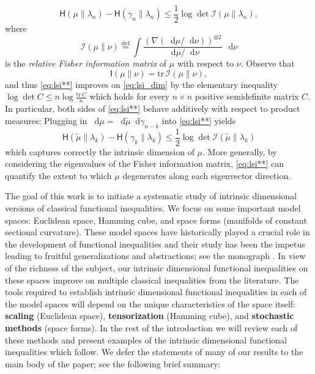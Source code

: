 \documentclass[a4paper,twoside,11pt,reqno]{amsart}
\newcommand{\eqdef}{\stackrel{\mathrm{def}}{=}}
\newcommand*\diff{\mathop{}\!\mathrm{d}}
\newcommand{\mr}{\mathrm}
\newcommand{\II}{\mathsf{I}}
\newcommand{\III}{\mathscr{I}}
\newcommand{\HH}{\mathsf{H}}
\begin{document}
\begin{equation} \label{eq:lsi**}
\HH(\mu\|\lambda_n) - \HH(\gamma_n\|\lambda_n) \leq \frac{1}{2}\log\det \III(\mu\|\lambda_n),
\end{equation}
where
\begin{equation}
\III(\mu\|\nu) \eqdef \int\frac{(\nabla (\diff\mu/\diff\nu))^{\otimes2}}{\diff\mu/\diff\nu}\,\diff\nu
\end{equation}
is the {\it relative Fisher information matrix} of $\mu$ with respect to $\nu$.  Observe that
\begin{equation}
\II(\mu\|\nu) = \mr{tr}\, \III(\mu\|\nu),
\end{equation}
and thus \eqref{eq:lsi**} improves on \eqref{eq:lsi_dim} by the elementary inequality $\log\det C \leq n\log \tfrac{\mr{tr}\, C}{n}$ which holds for every $n\times n$ positive semidefinite matrix $C$.  In particular, both sides of  \eqref{eq:lsi**} behave additively with respect to product measures: Plugging in $\diff\mu=\diff\tilde\mu\diff\gamma_{n-k}$ into \eqref{eq:lsi**} yields
\begin{equation} \label{eq:lsi**k}
\HH(\tilde\mu\|\lambda_k) - \HH(\gamma_k\|\lambda_k) \leq \frac{1}{2}\log\det \III(\tilde\mu\|\lambda_k)
\end{equation}
which captures correctly the intrinsic dimension of $\mu$.
More generally, by considering the eigenvalues of the Fisher information matrix, \eqref{eq:lsi**}  can quantify the extent to which $\mu$  degenerates along each eigenvector direction.


The goal of this work is to initiate a systematic study of intrinsic dimensional versions of classical functional inequalities. We focus on some important model spaces: Euclidean space, Hamming cube, and  space forms (manifolds of constant sectional curvature). These model spaces have historically played a crucial role in the development of functional inequalities and their study has been the impetus leading to fruitful generalizations and abstractions; see the monograph \cite{BGL14}.  In view of the richness of the subject, our intrinsic dimensional functional inequalities on these spaces improve on multiple classical inequalities from the literature. The tools required to establish intrinsic dimensional functional inequalities in each of the model spaces will depend on the unique characteristics of the space itself: {\bf scaling} (Euclidean space), {\bf tensorization} (Hamming cube), and {\bf stochastic methods} (space forms). In the rest of the introduction we will review each of these methods and present examples of the intrinsic dimensional functional inequalities which follow. We defer the statements of many of our results to the main body of the paper; see the following brief summary: 
\end{document}
